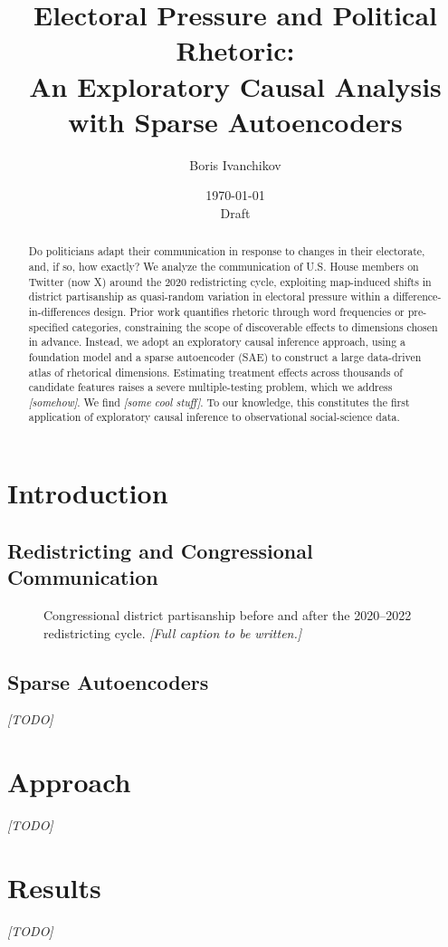 \documentclass[11pt]{article}
\title{Electoral Pressure and Political Rhetoric:\\An Exploratory Causal Analysis with Sparse Autoencoders}
\author{Boris Ivanchikov}
\date{\today\\[0.5em]\small Draft}
\newcommand{\todo}[1]{\textcolor{gray!70}{\itshape [#1]}}
\begin{document}
\maketitle

\begin{abstract}
Do politicians adapt their communication in response to changes in their electorate, and, if so, how exactly? We analyze the communication of U.S. House members on Twitter (now X) around the 2020 redistricting cycle, exploiting map-induced shifts in district partisanship as quasi-random variation in electoral pressure within a difference-in-differences design. Prior work quantifies rhetoric through word frequencies or pre-specified categories, constraining the scope of discoverable effects to dimensions chosen in advance. Instead, we adopt an exploratory causal inference approach, using a foundation model and a sparse autoencoder (SAE) to construct a large data-driven atlas of rhetorical dimensions. Estimating treatment effects across thousands of candidate features raises a severe multiple-testing problem, which we address \todo{somehow}. We find \todo{some cool stuff}. To our knowledge, this constitutes the first application of exploratory causal inference to observational social-science data. 
\end{abstract}

\section{Introduction}

\subsection{Redistricting and Congressional Communication}

\begin{figure}[ht!]
  \centering
  {\sffamily\resizebox{\textwidth}{!}{}}
  \caption{Congressional district partisanship before and after the
  2020--2022 redistricting cycle. \todo{Full caption to be written.}}
  \label{fig:redistricting}
\end{figure}

\subsection{Sparse Autoencoders}

\todo{TODO}

\section{Approach}

\todo{TODO}

\section{Results}

\todo{TODO}
\end{document}
